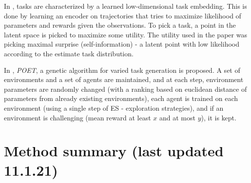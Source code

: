 \documentclass[letterpaper]{article}
\theoremstyle{definition}
\begin{document}
In \cite{Kaddour2020}, tasks are characterized by a learned low-dimensional task embedding. This is done by learning an encoder on trajectories that tries to maximize likelihood of parameters and rewards given the observations. To pick a task, a point in the latent space is picked to maximize some utility.
The utility used in the paper was picking maximal surprise (self-information) - a latent point with low likelihood according to the estimate task distribution.

In \cite{Wang2019}, \textit{POET}, a genetic algorithm for varied task generation is proposed. A set of environments and a set of agents are maintained, and at each step, environment parameters are randomly changed (with a ranking based on euclidean distance of parameters from already existing environments), each agent is trained on each environment (using a single step of ES - exploration strategies), and if an environment is challenging (mean reward at least $x$ and at most $y$), it is kept.

\section{Method summary (last updated 11.1.21)} \label{sec:summary}
\end{document}
